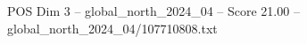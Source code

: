 \begin{textsample}{POS Dim 3 – global\_north\_2024\_04 – Score 21.00 – global\_north\_2024\_04/107710808.txt}
\end{textsample}
